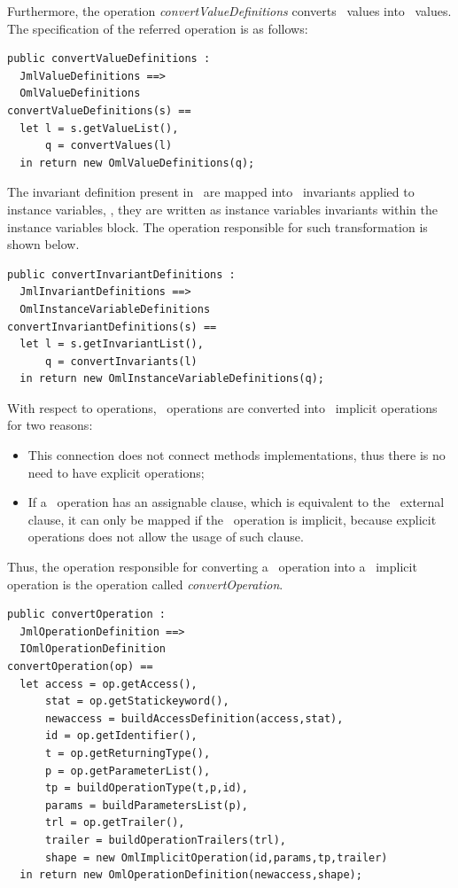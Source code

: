 Furthermore, the operation \textit{convertValueDefinitions} converts \jml\ values into \vpp\ values. The specification of the referred operation is as follows:

\bigskip
\begin{lstlisting}
public convertValueDefinitions :
  JmlValueDefinitions ==>
  OmlValueDefinitions
convertValueDefinitions(s) == 
  let l = s.getValueList(),
      q = convertValues(l)
  in return new OmlValueDefinitions(q);
\end{lstlisting}
\bigskip

The invariant definition present in \jml\ are mapped into \vpp\ invariants applied to instance variables, \ie, they are written as instance variables invariants within the instance variables block. The operation responsible for such transformation is shown below.

\bigskip
\begin{lstlisting}
public convertInvariantDefinitions :
  JmlInvariantDefinitions ==>
  OmlInstanceVariableDefinitions
convertInvariantDefinitions(s) == 
  let l = s.getInvariantList(),
      q = convertInvariants(l)
  in return new OmlInstanceVariableDefinitions(q);
\end{lstlisting}
\bigskip

With respect to operations, \jml\ operations are converted into \vpp\ implicit operations for two reasons:
\begin{itemize}
\item This connection does not connect methods implementations, thus there is no need to have explicit operations;
\item If a \jml\ operation has an assignable clause, which is equivalent to the \vpp\ external clause, it can only be mapped if the \vpp\ operation is implicit, because explicit operations does not allow the usage of such clause.
\end{itemize}
Thus, the operation responsible for converting a \jml\ operation into a \vpp\ implicit operation is the operation called \textit{convertOperation}.

\bigskip
\begin{lstlisting}
public convertOperation :
  JmlOperationDefinition ==>
  IOmlOperationDefinition
convertOperation(op) ==
  let access = op.getAccess(),
      stat = op.getStatickeyword(),
      newaccess = buildAccessDefinition(access,stat),
      id = op.getIdentifier(),
      t = op.getReturningType(),
      p = op.getParameterList(),
      tp = buildOperationType(t,p,id),
      params = buildParametersList(p),
      trl = op.getTrailer(),
      trailer = buildOperationTrailers(trl),
      shape = new OmlImplicitOperation(id,params,tp,trailer)
  in return new OmlOperationDefinition(newaccess,shape);
\end{lstlisting}
\bigskip

